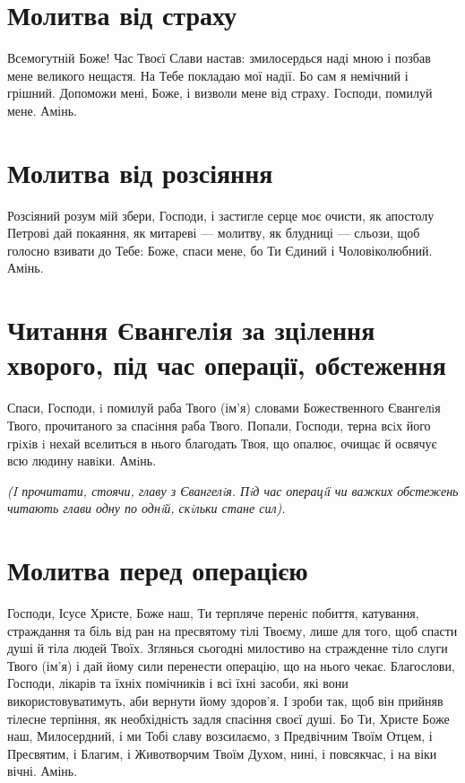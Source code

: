 \documentclass[chapters.tex]{subfiles}
\begin{document}
\section{Молитва від страху}
Всемогутній Боже! Час Твоєї Слави настав: змилосердься наді мною і позбав мене великого нещастя. На Тебе покладаю мої надії. Бо сам я немічний і грішний. Допоможи мені, Боже, і визволи мене від страху. Господи, помилуй мене. Амінь.

\section{Молитва від розсіяння}
Розсіяний розум мій збери, Господи, і застигле серце моє очисти, як апостолу Петрові дай покаяння, як митареві — молитву, як блудниці — сльози, щоб голосно взивати до Тебе: Боже, спаси мене, бо Ти Єдиний і Чоловіколюбний. Амінь.

\section{Читання Євангелiя за зцiлення хворого, під час операції, обстеження}
Спаси, Господи, i помилуй раба Твого (ім’я) словами Божественного Євангелiя Твого, прочитаного за спасiння раба Твого. Попали, Господи, терна всiх його грiхiв i нехай вселиться в нього благодать Твоя, що опалює, очищає й освячує всю людину навiки. Амiнь.

\emph{(I прочитати, стоячи, главу з Євангелiя. Пiд час операцiї чи важких обстежень читають глави одну по однiй, скiльки стане сил).}

\section{Молитва перед операцією}
Господи, Ісусе Христе, Боже наш, Ти терпляче переніс побиття, катування, страждання та біль від ран на пресвятому тілі Твоєму, лише для того, щоб спасти душі й тіла людей Твоїх. Зглянься сьогодні милостиво на стражденне тіло слуги Твого (ім’я) і дай йому сили перенести операцію, що на нього чекає. Благослови, Господи, лікарів та їхніх помічників і всі їхні засоби, які вони використовуватимуть, аби вернути йому здоров’я. І зроби так, щоб він прийняв тілесне терпіння, як необхідність задля спасіння своєї душі. Бо Ти, Христе Боже наш, Милосердний, і ми Тобі славу возсилаємо, з Предвічним Твоїм Отцем, і Пресвятим, і Благим, і Животворчим Твоїм Духом, нині, і повсякчас, і на віки вічні. Амінь.
\end{document}
